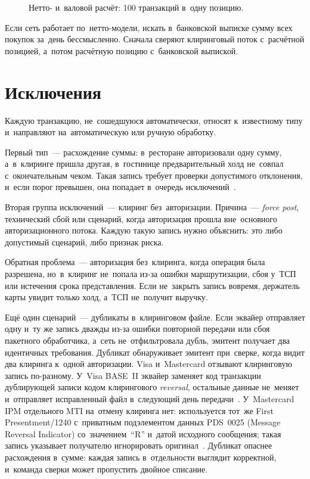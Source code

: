 \begin{figure}[!htbp]
  \centering
  \caption{Нетто- и~валовой расчёт: 100 транзакций в~одну позицию.}\label{fig:net-vs-gross}
\end{figure}

Если сеть работает по~нетто-модели, искать в~банковской выписке сумму всех
покупок за~день бессмысленно. Сначала сверяют клиринговый поток с~расчётной
позицией, а~потом расчётную позицию с~банковской выпиской.


\section{Исключения}\label{sec:recon-exceptions}

Каждую транзакцию, не~сошедшуюся автоматически, относят к~известному типу
и~направляют на~автоматическую или ручную обработку.

Первый тип~--- расхождение суммы: в~ресторане авторизовали одну сумму,
а~в~клиринге пришла другая, в~гостинице предварительный холд не~совпал
с~окончательным чеком. Такая запись требует проверки допустимого отклонения,
и~если порог превышен, она попадает в~очередь исключений~\cite{visa-core-rules}.

Вторая группа исключений~--- клиринг без~авторизации. Причина~--- \textit{force
post}, технический сбой или сценарий, когда авторизация прошла вне~основного
авторизационного потока. Каждую такую запись нужно объяснить: это либо допустимый
сценарий, либо признак риска.

Обратная проблема~--- авторизация без~клиринга, когда операция была разрешена,
но~в~клиринг не~попала из-за ошибки маршрутизации, сбоя у~ТСП или истечения
срока представления. Если не~закрыть запись вовремя, держатель карты увидит
только холд, а~ТСП не~получит выручку.

Ещё один сценарий~--- дубликаты в~клиринговом файле. Если эквайер отправляет
одну и~ту же запись дважды из-за ошибки повторной передачи или сбоя
пакетного обработчика, а~сеть не~отфильтровала дубль, эмитент получает два идентичных
требования. Дубликат обнаруживает эмитент при~сверке, когда видит два клиринга
к~одной авторизации. Visa и~Mastercard отзывают клиринговую запись по-разному.
У~Visa BASE~II эквайер заменяет код транзакции дублирующей записи кодом
клирингового \textit{reversal}, остальные данные не~меняет и~отправляет
исправленный файл в~следующий день передачи~\cite{visa-core-rules}. У~Mastercard IPM отдельного MTI
на~отмену клиринга нет: используется тот~же First Presentment/1240 с~приватным
подэлементом данных PDS~0025 (Message Reversal Indicator) со~значением~\enquote{R}
и~датой исходного сообщения; такая запись указывает получателю игнорировать
оригинал~\cite{mc-gcms-rm-2021}. Дубликат опаснее расхождения
в~сумме: каждая запись в~отдельности выглядит корректной, и~команда сверки может
пропустить двойное списание.

